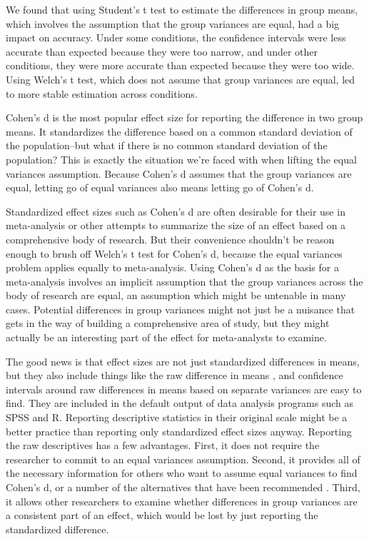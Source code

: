 \documentclass[man,a4paper,noextraspace,apacite]{apa6}
\begin{document}
    We found that using Student's t test to estimate the differences in group means, which involves the assumption that the group variances are equal, had a big impact on accuracy. Under some conditions, the confidence intervals were less accurate than expected because they were too narrow, and under other conditions, they were more accurate than expected because they were too wide. Using Welch's t test, which does not assume that group variances are equal, led to more stable estimation across conditions.
    
    Cohen's d \cite{Cohen1992} is the most popular effect size for reporting the difference in two group means. It standardizes the difference based on a common standard deviation of the population--but what if there is no common standard deviation of the population? This is exactly the situation we're faced with when lifting the equal variances assumption. Because Cohen's d assumes that the group variances are equal, letting go of equal variances also means letting go of Cohen's d. 
    
    Standardized effect sizes such as Cohen's d are often desirable for their use in meta-analysis or other attempts to summarize the size of an effect based on a comprehensive body of research. But their convenience shouldn't be reason enough to brush off Welch's t test for Cohen's d, because the equal variances problem applies equally to meta-analysis. Using Cohen's d as the basis for a meta-analysis involves an implicit assumption that the group variances across the body of research are equal, an assumption which might be untenable in many cases. Potential differences in group variances might not just be a nuisance that gets in the way of building a comprehensive area of study, but they might actually be an interesting part of the effect for meta-analysts to examine. 
    
    The good news is that effect sizes are not just standardized differences in means, but they also include things like the raw difference in means \cite{Cumming2014, Kelley2012}, and confidence intervals around raw differences in means based on separate variances are easy to find. They are included in the default output of data analysis programs such as SPSS and R. Reporting descriptive statistics in their original scale might be a better practice than reporting only standardized effect sizes anyway. Reporting the raw descriptives has a few advantages. First, it does not require the researcher to commit to an equal variances assumption. Second, it provides all of the necessary information for others who want to assume equal variances to find Cohen's d, or a number of the alternatives that have been recommended \cite{Peng2013, Grissom2001}. Third, it allows other researchers to examine whether differences in group variances are a consistent part of an effect, which would be lost by just reporting the standardized difference.
\end{document}
